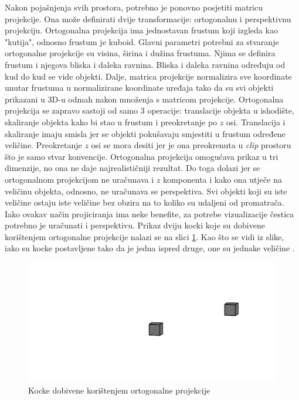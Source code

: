 \documentclass{foi}
\begin{document}
Nakon pojašnjenja svih prostora, potrebno je ponovno posjetiti matricu projekcije. Ona može definirati dvije transformacije: ortogonalnu i perspektivnu projekciju. Ortogonalna projekcija ima jednostavan frustum koji izgleda kao "kutija", odnosno frustum je kuboid. Glavni parametri potrebni za stvaranje ortogonalne projekcije su visina, širina i dužina frustuma. Njima se definira frustum i njegova bliska i daleka ravnina. Bliska i daleka ravnina određuju od kud do kud se vide objekti. Dalje, matrica projekcije normalizira sve koordinate unutar frustuma u normalizirane koordinate uređaja tako da su svi objekti prikazani u 3D-u odmah nakon množenja s matricom projekcije. Ortogonalna projekcija se zapravo sastoji od samo 3 operacije: translacije objekta u ishodište, skaliranje objekta kako bi stao u frustum i preokretanje po $z$ osi. Translacija i skaliranje imaju smisla jer se objekti pokušavaju smjestiti u frustum određene veličine. Preokretanje $z$ osi se mora desiti jer je ona preokrenuta u \textit{clip} prostoru što je samo stvar konvencije. Ortogonalna projekcija omogućava prikaz u tri dimenzije, no ona ne daje najrealističniji rezultat. Do toga dolazi jer se ortogonalnom projekcijom ne uračunava i $z$ komponenta i kako ona utječe na veličinu objekta, odnosno, ne uračunava se perspektiva. Svi objekti koji su iste veličine ostaju iste veličine bez obzira na to koliko su udaljeni od promatrača. Iako ovakav način projiciranja ima neke benefite, za potrebe vizualizacije čestica potrebno je uračunati i perspektivu. Prikaz dviju kocki koje su dobivene korištenjem ortogonalne projekcije nalazi se na slici \ref{fig:OrtogonalnaProjekcijaKuba}. Kao što se vidi iz slike, iako su kocke postavljene tako da je jedna ispred druge, one su jednake veličine \parencite{Orto3DBezDat}.

\begin{figure}[H]
	\centering
	\includegraphics[width=1\textwidth,trim={10cm 0cm 3cm 0cm},clip]{slike/36_OrtogonalnaProjekcijaKuba.png}
	\captionsetup{justification=centering}
	\caption{Kocke dobivene korištenjem ortogonalne projekcije}
	\label{fig:OrtogonalnaProjekcijaKuba}
\end{figure}
\end{document}
